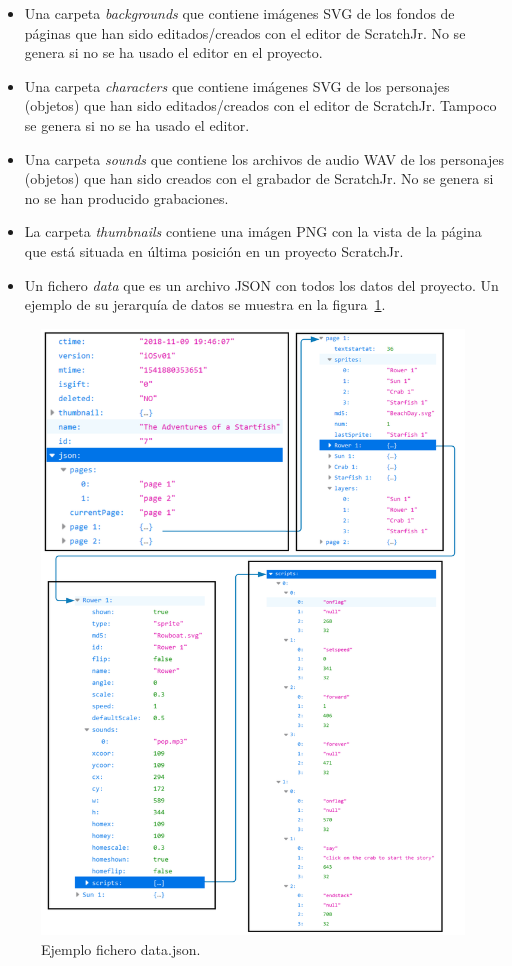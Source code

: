 \documentclass[a4paper, 12pt]{book}
\begin{document}
\begin{itemize}
    \item Una carpeta \emph{backgrounds} que contiene imágenes SVG de los fondos de páginas que han sido editados/creados con el editor de ScratchJr.
    No se genera si no se ha usado el editor en el proyecto.
    \item Una carpeta \emph{characters} que contiene imágenes SVG de los personajes (objetos) que han sido editados/creados con el editor de ScratchJr.
    Tampoco se genera si no se ha usado el editor.
    \item Una carpeta \emph{sounds} que contiene los archivos de audio WAV de los personajes (objetos) que han sido creados con el grabador de ScratchJr.
    No se genera si no se han producido grabaciones.
    \item La carpeta \emph{thumbnails} contiene una imágen PNG con la vista de la página que está situada en última posición en un proyecto ScratchJr.
    \item Un fichero \emph{data} que es un archivo JSON con todos los datos del proyecto. Un ejemplo de su jerarquía de datos se muestra en la figura~\ref{fig:jerarquia_json}.
\end{itemize}

\begin{figure}[ht]
  \centering
  \includegraphics[width=15cm, keepaspectratio]{img/jerarquia_json.png}
  \caption{Ejemplo fichero data.json.}\label{fig:jerarquia_json}
\end{figure}
\end{document}
